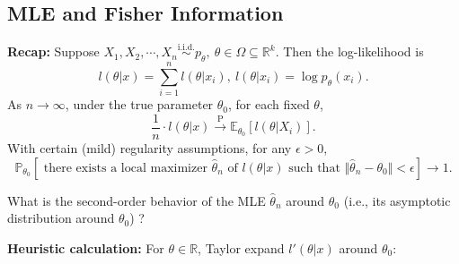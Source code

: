 \documentclass[a4paper]{article}
\begin{document}
\subsection{MLE and Fisher Information}
\textbf{Recap:} Suppose $X_1,X_2,\cdots,X_n \stackrel{\text{i.i.d.}}{\sim} p_{\theta}, \ \theta \in \Omega \subseteq \mathbb{R}^k$. Then the log-likelihood is
\begin{equation*}
	l(\theta|x) = \sum\limits_{i=1}^n l(\theta|x_i), \ l(\theta|x_i) = \log p_{\theta}(x_i).
\end{equation*}
As $n \to \infty$, under the true parameter $\theta_0$, for each fixed $\theta$,
\begin{equation*}
	\frac{1}{n} \cdot l(\theta|x) \stackrel{\text{P}}{\longrightarrow} \mathbb{E}_{\theta_0}[l(\theta|X_i)].
\end{equation*}
With certain (mild) regularity assumptions, for any $\epsilon > 0$,
\begin{equation*}
	\mathbb{P}_{\theta_0}[\text{ there exists a local maximizer } \hat{\theta}_n \text{ of } l(\theta|x) \text{ such that } \Vert \hat{\theta}_n - \theta_0 \Vert < \epsilon] \to 1.
\end{equation*}

\begin{question}
	What is the second-order behavior of the MLE $\hat{\theta}_n$ around $\theta_0$ (i.e., its asymptotic distribution around $\theta_0$) ?
\end{question}

\noindent \textbf{Heuristic calculation:} For $\theta \in \mathbb{R}$, Taylor expand $l'(\theta|x)$ around $\theta_0$: 
\end{document}
